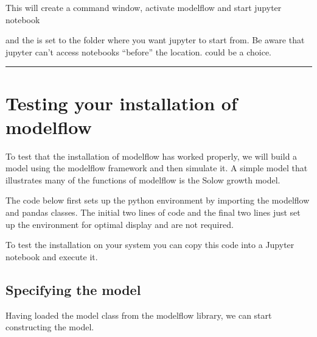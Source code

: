 \documentclass[letterpaper,10pt,english]{jupyterBook}
\begin{document}
\begin{sphinxVerbatim}[commandchars=\\\{\}]
\PYGZbs{}\PYGZbs{}  \PYGZbs{}\PYGZbs{}\PYGZbs{} \PYGZbs{}\PYGZbs{}\PYGZbs{} 
\end{sphinxVerbatim}

\sphinxAtStartPar
This will create a command window, activate modelflow and start jupyter notebook

\sphinxAtStartPar
and the   is set to the folder where you want jupyter to start from. 
Be aware that jupyter can’t access notebooks “before” the  location.  could be a choice.


\bigskip\hrule\bigskip


\sphinxstepscope


\chapter{Testing your installation of modelflow}
\label{\detokenize{content/03_Installation/TestingModelFlow:testing-your-installation-of-modelflow}}\label{\detokenize{content/03_Installation/TestingModelFlow::doc}}
\sphinxAtStartPar
To test that the installation of modelflow has worked properly, we will build a model using the modelflow framework and then simulate it.  A simple model that illustrates many of the functions of modelflow is the Solow growth model.

\sphinxAtStartPar
The code below first sets up the python environment by importing the modelflow  and pandas classes.  The initial two lines of code and the final two lines just set up the environment for optimal display and are not required.

\sphinxAtStartPar
To test the installation on your system you can copy this code into a Jupyter notebook and execute it.


\section{Specifying the model}
\label{\detokenize{content/03_Installation/TestingModelFlow:specifying-the-model}}
\sphinxAtStartPar
Having loaded the model class from the modelflow library, we can start constructing the model.
\end{document}

